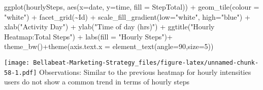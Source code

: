 \documentclass[
]{article}
\newenvironment{Shaded}{\begin{snugshade}}{\end{snugshade}}
\newcommand{\AttributeTok}[1]{\textcolor[rgb]{0.77,0.63,0.00}{#1}}
\newcommand{\DecValTok}[1]{\textcolor[rgb]{0.00,0.00,0.81}{#1}}
\newcommand{\FunctionTok}[1]{\textcolor[rgb]{0.00,0.00,0.00}{#1}}
\newcommand{\NormalTok}[1]{#1}
\newcommand{\SpecialCharTok}[1]{\textcolor[rgb]{0.00,0.00,0.00}{#1}}
\newcommand{\StringTok}[1]{\textcolor[rgb]{0.31,0.60,0.02}{#1}}
\begin{document}
\begin{Shaded}
\begin{Highlighting}[]
\FunctionTok{ggplot}\NormalTok{(hourlySteps, }\FunctionTok{aes}\NormalTok{(}\AttributeTok{x=}\NormalTok{date, }\AttributeTok{y=}\NormalTok{time, }\AttributeTok{fill =}\NormalTok{ StepTotal)) }\SpecialCharTok{+} 
  \FunctionTok{geom\_tile}\NormalTok{(}\AttributeTok{colour =} \StringTok{"white"}\NormalTok{) }\SpecialCharTok{+} \FunctionTok{facet\_grid}\NormalTok{(}\SpecialCharTok{\textasciitilde{}}\NormalTok{Id) }\SpecialCharTok{+} \FunctionTok{scale\_fill\_gradient}\NormalTok{(}\AttributeTok{low=}\StringTok{"white"}\NormalTok{, }\AttributeTok{high=}\StringTok{"blue"}\NormalTok{) }\SpecialCharTok{+}  \FunctionTok{xlab}\NormalTok{(}\StringTok{"Activity Day"}\NormalTok{) }\SpecialCharTok{+} \FunctionTok{ylab}\NormalTok{(}\StringTok{"Time of day (hrs)"}\NormalTok{) }\SpecialCharTok{+} \FunctionTok{ggtitle}\NormalTok{(}\StringTok{"Hourly Heatmap:Total Steps"}\NormalTok{) }\SpecialCharTok{+} \FunctionTok{labs}\NormalTok{(}\AttributeTok{fill =} \StringTok{"Hourly Steps"}\NormalTok{)}\SpecialCharTok{+}
  \FunctionTok{theme\_bw}\NormalTok{()}\SpecialCharTok{+}\FunctionTok{theme}\NormalTok{(}\AttributeTok{axis.text.x =} \FunctionTok{element\_text}\NormalTok{(}\AttributeTok{angle=}\DecValTok{90}\NormalTok{,}\AttributeTok{size=}\DecValTok{5}\NormalTok{))}
\end{Highlighting}
\end{Shaded}

\texttt{[image: Bellabeat-Marketing-Strategy\_files/figure-latex/unnamed-chunk-58-1.pdf]}
Observations: Similar to the previous heatmap for hourly intensities
users do not show a common trend in terms of hourly steps
\end{document}
